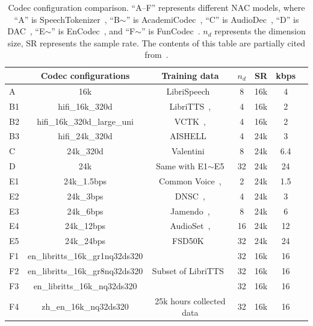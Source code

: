 \documentclass[conference]{IEEEtran}
\begin{document}
\begin{table}[t!]
\centering
\fontsize{8}{10}\selectfont
\setlength\tabcolsep{2pt}
\caption{Codec configuration comparison. ``A--F'' represents different NAC models, where ``A'' is SpeechTokenizer~\cite{zhang2023speechtokenizer}, ``B$\sim$'' is AcademiCodec~\cite{yang2023hifi}, ``C'' is AudioDec~\cite{wu2023audiodec}, ``D'' is DAC~\cite{kumar2023high}, ``E$\sim$'' is EnCodec~\cite{defossez2023high}, and ``F$\sim$'' is FunCodec~\cite{du2023funcodec}.  $n_d$ represents the dimension size, SR represents the sample rate. The contents of this table are partially cited from~\cite{wu2024audiolanguagemodeling}.}
\label{tab:nac_models}
\begin{tabularx}{0.48\textwidth}{lcccccc}
    \toprule
    & \textbf{Codec configurations} & \textbf{Training data} & $n_d$ & \textbf{SR} & \textbf{kbps} \\
    \midrule
    A & 16k & LibriSpeech~\cite{librispeech} & 8 & 16k & 4 \\
    \midrule
    B1 & hifi\_16k\_320d & LibriTTS~\cite{zen19}, & 4 & 16k & 2 \\
    B2 & hifi\_16k\_320d\_large\_uni & VCTK~\cite{Veaux2016SUPERSEDEDC}, & 4 & 16k & 2 \\
    B3 & hifi\_24k\_320d & AISHELL~\cite{8384449} & 4 & 24k & 3 \\
    \midrule
    C & 24k\_320d & Valentini~\cite{valentini-botinhao2017noisy}  & 8 & 24k & 6.4 \\
    \midrule
    D & 24k & Same with E1$\sim$E5 & 32 & 24k & 24 \\
    \midrule
    E1 & 24k\_1.5bps & Common Voice~\cite{ardila-etal-2020-common},   & 2 & 24k & 1.5 \\
    E2 & 24k\_3bps & DNSC~\cite{dns},  & 4 & 24k & 3 \\
    E3 & 24k\_6bps &  Jamendo~\cite{bogdanov2019mtg}, & 8 & 24k & 6 \\
    E4 & 24k\_12bps & AudioSet~\cite{gemmeke2017audio},  & 16 & 24k & 12 \\
    E5 & 24k\_24bps & FSD50K~\cite{fonseca2021fsd50k}  & 32 & 24k & 24 \\
    \midrule
    F1 & en\_libritts\_16k\_gr1nq32ds320 &  & 32 & 16k & 16 \\
    F2 & en\_libritts\_16k\_gr8nq32ds320  & Subset of LibriTTS~\cite{zen19} & 32 & 16k & 16 \\
    F3 & en\_libritts\_16k\_nq32ds320 &  & 32 & 16k & 16 \\
    F4 & zh\_en\_16k\_nq32ds320 & 25k hours collected data & 32 & 16k & 16 \\
    \bottomrule
\end{tabularx}
\vspace{-3mm}
\end{table}
\end{document}
